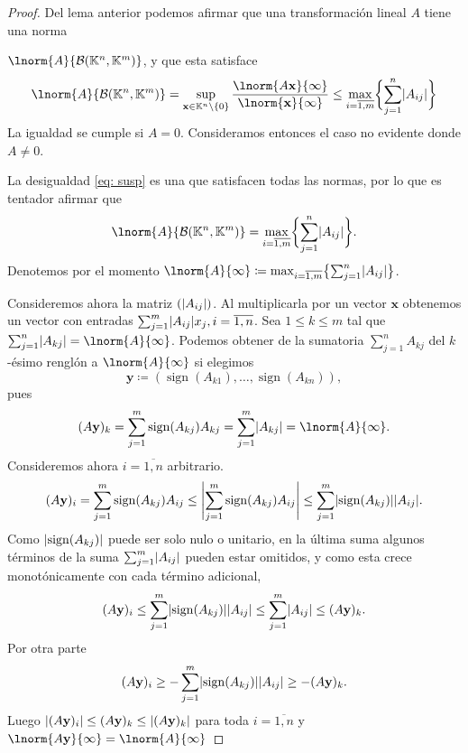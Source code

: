 \documentclass[11pt]{article}
\renewcommand{\vec}{\mathbf} %
\DeclarePairedDelimiter{\abs}{\lvert }{\rvert}
\DeclareMathOperator{\sign}{sign}
\begin{document}
\begin{Answer}
	\begin{proof}
	Del lema anterior podemos afirmar que una transformación lineal $A$ tiene una norma\par
	$\lnorm{A}{{\mathcal B(\mathbb K^n, \mathbb K^m)}}$, y que esta satisface
	\begin{equation}
		\lnorm{A}{{\mathcal B(\mathbb K^n, \mathbb K^m)}} = \sup_{\vec x \in \mathbb K^n\backslash\{0\} }\frac{\lnorm{A\vec x}{\infty}}{\lnorm{\vec x}{\infty}}
		\le  \max_{i = \overline{1,m}} \biggl\{ \sum_{j=1}^n \abs{A_{ij}}\biggr\}
	\end{equation}
	La igualdad se cumple si $A = 0$. Consideramos entonces el caso no evidente donde $A \neq 0$.
	
	La desigualdad \eqref{eq: susp} es una que satisfacen todas las normas, por lo que es tentador afirmar que
	\begin{equation}
		\lnorm{A}{{\mathcal B(\mathbb K^n, \mathbb K^m)}} = \max_{i = \overline{1,m}} \biggl\{ \sum_{j=1}^n \abs{A_{ij}}\biggr\}.
	\end{equation}
	Denotemos por el momento $\lnorm{A}{\infty} \coloneqq \max_{i = \overline{1,m}} \bigl\{ \sum_{j=1}^n \abs{A_{ij}}\bigr\}$.
	
	Consideremos ahora la matriz $(\abs{A_{ij}})$. Al multiplicarla por un vector $\vec x$ obtenemos un vector con entradas $\sum_{j = 1}^m \abs{A_{ij}} x_j, i = \overline{1,n}$. Sea $1 \le k \le m$ tal que $\sum_{j=1}^n \abs{A_{kj}} = \lnorm{A}{\infty}$. Podemos obtener de la sumatoria  $\sum_{j=1}^n A_{kj}$ del $k$-ésimo renglón a $\lnorm{A}{\infty}$ si elegimos
	\begin{equation}
		\vec y \coloneqq \left( \sign(A_{k1}),\dotsc, \sign(A_{kn}) \right),
	\end{equation}
	pues
	\begin{equation}
		(A\vec y)_k = \sum_{j = 1}^m \sign(A_{kj})A_{kj} = \sum_{j = 1}^m \abs{A_{kj}} = \lnorm{A}{\infty}.
	\end{equation}
	Consideremos ahora $i = \overline{1,n}$ arbitrario.
	\begin{equation}
		(A\vec y)_i = \sum_{j = 1}^m  \sign(A_{kj}) A_{ij}
		\le \abs[\Bigg]{ \sum_{j = 1}^m \sign(A_{kj}) A_{ij}}
		\le  \sum_{j = 1}^m \abs{\sign(A_{kj})} \abs{A_{ij}}.
	\end{equation}
	Como $\abs{\sign(A_{kj})}$ puede ser solo nulo o unitario, en la última suma algunos términos de la suma $\sum_{j = 1}^m \abs{A_{ij}}$ pueden estar omitidos, y como esta crece monotónicamente con cada término adicional,
	\begin{equation}
		(A\vec y)_i 
		\le  \sum_{j = 1}^m \abs{\sign(A_{kj})} \abs{A_{ij}}
		\le \sum_{j = 1}^m \abs{A_{ij}}
		\le (A\vec y)_k.
	\end{equation}
	Por otra parte
	\begin{equation}
		(A\vec y)_i 
		\ge  -\sum_{j = 1}^m \abs{\sign(A_{kj})} \abs{A_{ij}}
		\ge -(A\vec y)_k.
	\end{equation}
	Luego $\abs{(A\vec y)_i } \le (A\vec y)_k \le \abs{(A\vec y)_k} $ para toda $i = \overline{1,n}$ y $\lnorm{A\vec y}{\infty} = \lnorm{A}{\infty}$
	

\end{proof}
\end{Answer}
\end{document}
